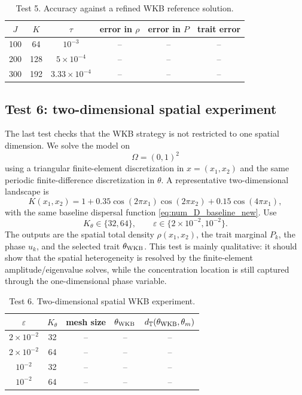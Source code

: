 \documentclass[11pt]{article}
\begin{document}
\begin{table}[ht]
\centering
\caption{Test 5. Accuracy against a refined WKB reference solution.}
\begin{tabular}{cccccc}
\toprule
$J$ & $K$ & $\tau$ & error in $\rho$ & error in $P$ & trait error\\
\midrule
100 & 64 & $10^{-3}$ & -- & -- & --\\
200 & 128 & $5\times10^{-4}$ & -- & -- & --\\
300 & 192 & $3.33\times10^{-4}$ & -- & -- & --\\
\bottomrule
\end{tabular}
\end{table}

\subsection{Test 6: two-dimensional spatial experiment}\label{subsec:test_2d_new}

The last test checks that the WKB strategy is not restricted to one spatial dimension.  We solve the model on
\[
    \Omega=(0,1)^2
\]
using a triangular finite-element discretization in \(x=(x_1,x_2)\) and the same periodic finite-difference discretization in \(\theta\).  A representative two-dimensional landscape is
\begin{equation}\label{eq:K_2d_new}
    K(x_1,x_2)=1+0.35\cos(2\pi x_1)\cos(2\pi x_2)+0.15\cos(4\pi x_1),
\end{equation}
with the same baseline dispersal function \eqref{eq:num_D_baseline_new}.  Use
\[
    K_\theta\in\{32,64\},
    \qquad
    \varepsilon\in\{2\times10^{-2},10^{-2}\}.
\]
The outputs are the spatial total density \(\rho(x_1,x_2)\), the trait marginal \(P_k\), the phase \(u_k\), and the selected trait \(\theta_{\rm WKB}\).  This test is mainly qualitative: it should show that the spatial heterogeneity is resolved by the finite-element amplitude/eigenvalue solves, while the concentration location is still captured through the one-dimensional phase variable.

\begin{table}[ht]
\centering
\caption{Test 6. Two-dimensional spatial WKB experiment.}
\begin{tabular}{ccccc}
\toprule
$\varepsilon$ & $K_\theta$ & mesh size & $\theta_{\rm WKB}$ & $d_{\mathbb T}(\theta_{\rm WKB},\theta_m)$\\
\midrule
$2\times10^{-2}$ & 32 & -- & -- & --\\
$2\times10^{-2}$ & 64 & -- & -- & --\\
$10^{-2}$ & 32 & -- & -- & --\\
$10^{-2}$ & 64 & -- & -- & --\\
\bottomrule
\end{tabular}
\end{table}
\end{document}
